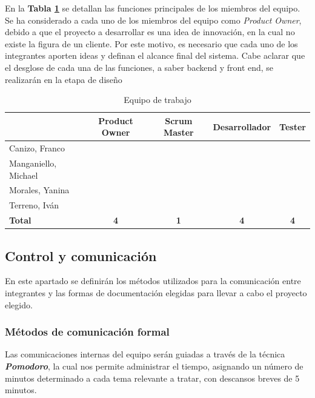 En la \textbf{Tabla \ref{equipoDeTrabajo}} se detallan las funciones principales de los miembros del equipo.
Se ha considerado a cada uno de los miembros del equipo como \textit{Product Owner}, debido a que el proyecto a desarrollar es una idea de innovación, en la cual no existe la figura de un cliente.
Por este motivo, es necesario que cada uno de los integrantes aporten ideas y definan el alcance final del sistema.
{\correccionTexto
Cabe aclarar que el desglose de cada una de las funciones, a saber backend y front end, se realizarán en la etapa de diseño
}

\begin{table}[h]
\begin{center}
\begin{tabular}{|l|c|c|c|c|}
	\hline                      & Product Owner & Scrum Master & Desarrollador & Tester     \\
	\hline Canizo, Franco       & \checkmark    &              & \checkmark    & \checkmark \\
	\hline Manganiello, Michael & \checkmark    & \checkmark   & \checkmark    & \checkmark \\
	\hline Morales, Yanina      & \checkmark    &              & \checkmark    & \checkmark \\
	\hline Terreno, Iván        & \checkmark    &              & \checkmark    & \checkmark \\
	\hline \textbf{Total}       & \textbf{4}    & \textbf{1}   & \textbf{4}    & \textbf{4} \\
\hline
\end{tabular}
\caption{Equipo de trabajo}
\label{equipoDeTrabajo}
\end{center}
\end{table}


\subsection{Control y comunicación}
En este apartado se definirán los métodos utilizados para la comunicación entre integrantes y las formas de documentación elegidas para llevar a cabo el proyecto elegido.


\subsubsection{Métodos de comunicación formal}
Las comunicaciones internas del equipo serán guiadas a través de la técnica \textbf{\textit{Pomodoro}}, la cual nos permite administrar el tiempo, asignando un número de minutos determinado a cada tema relevante a tratar, con descansos breves de 5 minutos.

